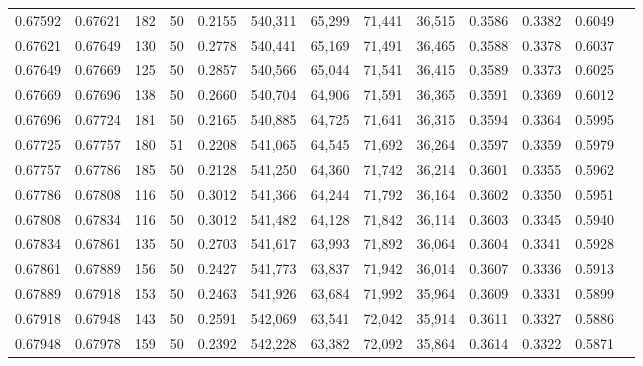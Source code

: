 \begin{tabular}{rrrrrrrrrrrrr}
0.67592 & 0.67621 &   182 &  50 &                                     0.2155 & 540,311 &  65,299 &  71,441 &  36,515 & 0.3586 & 0.3382 & 0.6049 \\
0.67621 & 0.67649 &   130 &  50 &                                     0.2778 & 540,441 &  65,169 &  71,491 &  36,465 & 0.3588 & 0.3378 & 0.6037 \\
0.67649 & 0.67669 &   125 &  50 &                                     0.2857 & 540,566 &  65,044 &  71,541 &  36,415 & 0.3589 & 0.3373 & 0.6025 \\
0.67669 & 0.67696 &   138 &  50 &                                     0.2660 & 540,704 &  64,906 &  71,591 &  36,365 & 0.3591 & 0.3369 & 0.6012 \\
0.67696 & 0.67724 &   181 &  50 &                                     0.2165 & 540,885 &  64,725 &  71,641 &  36,315 & 0.3594 & 0.3364 & 0.5995 \\
0.67725 & 0.67757 &   180 &  51 &                                     0.2208 & 541,065 &  64,545 &  71,692 &  36,264 & 0.3597 & 0.3359 & 0.5979 \\
0.67757 & 0.67786 &   185 &  50 &                                     0.2128 & 541,250 &  64,360 &  71,742 &  36,214 & 0.3601 & 0.3355 & 0.5962 \\
0.67786 & 0.67808 &   116 &  50 &                                     0.3012 & 541,366 &  64,244 &  71,792 &  36,164 & 0.3602 & 0.3350 & 0.5951 \\
0.67808 & 0.67834 &   116 &  50 &                                     0.3012 & 541,482 &  64,128 &  71,842 &  36,114 & 0.3603 & 0.3345 & 0.5940 \\
0.67834 & 0.67861 &   135 &  50 &                                     0.2703 & 541,617 &  63,993 &  71,892 &  36,064 & 0.3604 & 0.3341 & 0.5928 \\
0.67861 & 0.67889 &   156 &  50 &                                     0.2427 & 541,773 &  63,837 &  71,942 &  36,014 & 0.3607 & 0.3336 & 0.5913 \\
0.67889 & 0.67918 &   153 &  50 &                                     0.2463 & 541,926 &  63,684 &  71,992 &  35,964 & 0.3609 & 0.3331 & 0.5899 \\
0.67918 & 0.67948 &   143 &  50 &                                     0.2591 & 542,069 &  63,541 &  72,042 &  35,914 & 0.3611 & 0.3327 & 0.5886 \\
0.67948 & 0.67978 &   159 &  50 &                                     0.2392 & 542,228 &  63,382 &  72,092 &  35,864 & 0.3614 & 0.3322 & 0.5871 \\

\end{tabular}
